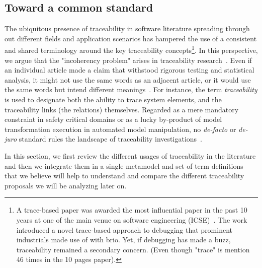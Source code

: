 \subsection{Toward a common standard}\label{sec:terminology}

%

The ubiquitous presence of traceability in software literature spreading through out different fields and application scenarios has hampered the use of a consistent and shared terminology around the key traceability concepts\footnote{A trace-based paper was awarded the most influential paper in the past 10 years at one of the main venue on software engineering (ICSE)~\cite{ko2008-whyline-debugging}. The work introduced a novel trace-based approach to debugging that prominent industrials made use of with brio. Yet, if debugging has made a buzz, traceability remained a secondary concern. (Even though "trace" is mention 46 times in the 10 pages paper).}.  
In this perspective, we argue that the "incoherency problem" arises in traceability research~\cite{watts2017-incoherency-problem}. Even if an individual article made a claim that withstood rigorous testing and statistical analysis, it might not use the same words as an adjacent article, or it would use the same words but intend different meanings~\cite{bouillon2013-survey-on-usage-scenario-requirements-traceability-in-practice,antoniol2017-traceability-grand-challenges}. %
For instance, the term \textit{traceability} is used to designate both the ability to trace system elements, and the traceability links (the relations) themselves. Regarded as a mere mandatory constraint in safety critical domains or as a lucky by-product of model transformation execution in automated model manipulation, no \textit{de-facto} or \textit{de-juro} standard rules the landscape of traceability investigations~\cite{mader2009-motivation-matters-in-traceability-practitioner-survey}.


In this section, we first review the different usages of traceability in the literature and then we integrate them in a single metamodel and set of term definitions that we believe will help to understand and compare the different traceability proposals we will be analyzing later on. 



